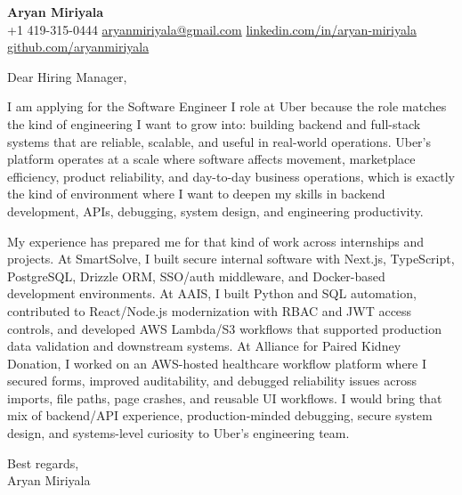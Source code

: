 \documentclass[letterpaper,11pt]{article}
\begin{document}
\begin{center}
    {\Large \textbf{Aryan Miriyala}}\\
    \vspace{2pt}
    +1 419-315-0444 \textbar{} \href{mailto:aryanmiriyala@gmail.com}{aryanmiriyala@gmail.com} \textbar{} \href{https://www.linkedin.com/in/aryan-miriyala-7788a21b6/}{linkedin.com/in/aryan-miriyala} \textbar{} \href{https://github.com/aryanmiriyala}{github.com/aryanmiriyala}
\end{center}

\vspace{10pt}

Dear Hiring Manager,

I am applying for the Software Engineer I role at Uber because the role matches the kind of engineering I want to grow into: building backend and full-stack systems that are reliable, scalable, and useful in real-world operations. Uber's platform operates at a scale where software affects movement, marketplace efficiency, product reliability, and day-to-day business operations, which is exactly the kind of environment where I want to deepen my skills in backend development, APIs, debugging, system design, and engineering productivity.

My experience has prepared me for that kind of work across internships and projects. At SmartSolve, I built secure internal software with Next.js, TypeScript, PostgreSQL, Drizzle ORM, SSO/auth middleware, and Docker-based development environments. At AAIS, I built Python and SQL automation, contributed to React/Node.js modernization with RBAC and JWT access controls, and developed AWS Lambda/S3 workflows that supported production data validation and downstream systems. At Alliance for Paired Kidney Donation, I worked on an AWS-hosted healthcare workflow platform where I secured forms, improved auditability, and debugged reliability issues across imports, file paths, page crashes, and reusable UI workflows. I would bring that mix of backend/API experience, production-minded debugging, secure system design, and systems-level curiosity to Uber's engineering team.

\vspace{8pt}

Best regards,\\
Aryan Miriyala
\end{document}
